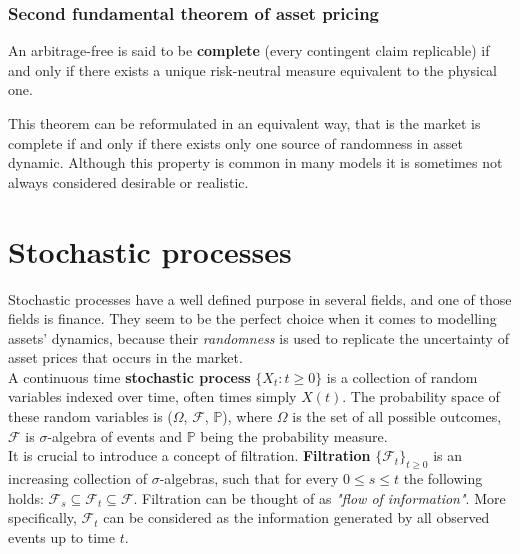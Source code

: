 \documentclass[times, utf8, diplomski]{fer}
\begin{document}


\subsection{Second fundamental theorem of asset pricing}
\begin{theorem}
An arbitrage-free is said to be \textbf{complete} (every contingent claim replicable) if and only if there exists a unique risk-neutral measure equivalent to the physical one.
\end{theorem}

\hfill \break
This theorem can be reformulated in an equivalent way, that is the market is complete if and only if there exists only one source of randomness in asset dynamic. Although this property is common in many models it is sometimes not always considered desirable or realistic. 
\chapter{Stochastic processes}
Stochastic processes have a well defined purpose in several fields, and one of those fields is finance. They seem to be the perfect choice when it comes to modelling assets' dynamics, because their \textit{randomness} is used to replicate the uncertainty of asset prices that occurs in the market.\\

A continuous time \textbf{stochastic process} $\{X_t: t\ge 0\}$ is a collection of random variables indexed over time, often times simply $X(t)$. The probability space of these random variables is ($\Omega$, $\mathcal{F}$, $\mathbb{P}$), where $\Omega$ is the set of all possible outcomes, $\mathcal{F}$ is $\sigma$-algebra of events and $\mathbb{P}$ being the probability measure.\\
It is crucial to introduce a concept of filtration. \textbf{Filtration} $\{\mathcal{F}_t\}_{t\ge 0}$ is an increasing collection of $\sigma$-algebras, such that for every $0 \le s \le t$ the following holds: $\mathcal{F}_s \subseteq \mathcal{F}_t \subseteq \mathcal{F}$. Filtration can be thought of as \textit{"flow of information"}. More specifically, $\mathcal{F}_t$ can be considered as the information generated by all observed events up to time $t$.
\end{document}

